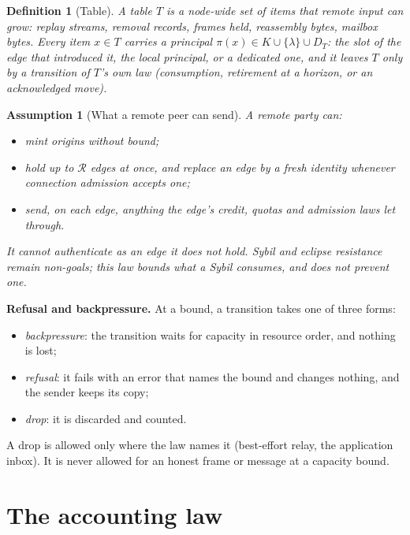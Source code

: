\documentclass[journal]{IEEEtran}
\newtheorem{definition}{Definition}
\newtheorem{assumption}{Assumption}
\newcommand{\Rg}{\mathcal{R}}
\begin{document}
\begin{definition}[Table]\label{def:table}
A table $T$ is a node-wide set of items that remote input can grow: replay streams, removal
records, frames held, reassembly bytes, mailbox bytes.  Every item $x\in T$ carries a principal
$\pi(x)\in K\cup\{\lambda\}\cup D_T$: the slot of the edge that \emph{introduced} it, the local
principal, or a dedicated one, and it
leaves $T$ only by a transition of $T$'s own law (consumption, retirement at a horizon, or an
acknowledged move).
\end{definition}

\begin{assumption}[What a remote peer can send]\label{as:remote}
A remote party can:
\begin{itemize}[leftmargin=1.2em]
\item mint origins without bound;
\item hold up to $\Rg$ edges at once, and replace an edge by a fresh identity whenever
connection admission accepts one;
\item send, on each edge, anything the edge's credit, quotas and admission laws let through.
\end{itemize}
It cannot authenticate as an edge it does not hold.  Sybil and eclipse resistance remain
non-goals; this law bounds what a Sybil consumes, and does not prevent one.
\end{assumption}

\textbf{Refusal and backpressure.}  At a bound, a transition takes one of three forms:
\begin{itemize}[leftmargin=1.2em]
\item \emph{backpressure}: the transition waits for capacity in resource order, and nothing is
lost;
\item \emph{refusal}: it fails with an error that names the bound and changes nothing, and the
sender keeps its copy;
\item \emph{drop}: it is discarded and counted.
\end{itemize}
A drop is allowed only where the law names it (best-effort relay, the application inbox).  It
is never allowed for an honest frame or message at a capacity bound.

\section{The accounting law}\label{sec:accounting}
\end{document}
